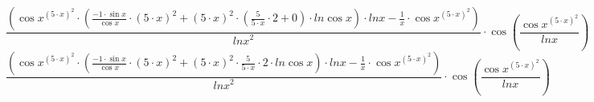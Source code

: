 \documentclass[12pt,a4paper]{article}
\begin{document}
\begin{flushleft}
\begin{equation}{{\frac {({{{{\cos {x }}^ {{({5 }\cdot {x })}^ {2 }}}\cdot {({{\frac {{-1 }\cdot {\sin {x }}}{\cos {x }}}\cdot {{({5 }\cdot {x })}^ {2 }}}+ {{{{({5 }\cdot {x })}^ {2 }}\cdot {({{\frac {5 }{{5 }\cdot {x }}}\cdot {2 }}+ {0 })}}\cdot {ln {\cos {x }}}})}}\cdot {ln {x }}}- {{\frac {1 }{x }}\cdot {{\cos {x }}^ {{({5 }\cdot {x })}^ {2 }}}})}{{ln {x }}^ {2 }}}\cdot {\cos {(\frac {{\cos {x }}^ {{({5 }\cdot {x })}^ {2 }}}{ln {x }})}}}\end{equation}
\begin{equation}{{\frac {({{{{\cos {x }}^ {{({5 }\cdot {x })}^ {2 }}}\cdot {({{\frac {{-1 }\cdot {\sin {x }}}{\cos {x }}}\cdot {{({5 }\cdot {x })}^ {2 }}}+ {{{{({5 }\cdot {x })}^ {2 }}\cdot {{\frac {5 }{{5 }\cdot {x }}}\cdot {2 }}}\cdot {ln {\cos {x }}}})}}\cdot {ln {x }}}- {{\frac {1 }{x }}\cdot {{\cos {x }}^ {{({5 }\cdot {x })}^ {2 }}}})}{{ln {x }}^ {2 }}}\cdot {\cos {(\frac {{\cos {x }}^ {{({5 }\cdot {x })}^ {2 }}}{ln {x }})}}}\end{equation}

\end{flushleft}
\end{document}
